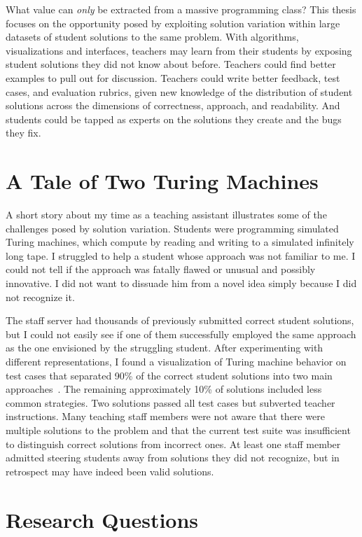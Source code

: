 \documentclass[12pt,twoside]{mitthesis}
\begin{document}
What value can {\it only} be extracted from a massive programming class? This thesis focuses on the opportunity posed by exploiting solution variation within large datasets of student solutions to the same problem. With algorithms, visualizations and interfaces, teachers may learn from their students by exposing student solutions they did not know about before. Teachers could find better examples to pull out for discussion. Teachers could write better feedback, test cases, and evaluation rubrics, given new knowledge of the distribution of student solutions across the dimensions of correctness, approach, and readability. And students could be tapped as experts on the solutions they create and the bugs they fix.

\section{A Tale of Two Turing Machines}

A short story about my time as a teaching assistant illustrates some of the challenges posed by solution variation. Students were programming simulated Turing machines, which compute by reading and writing to a simulated infinitely long tape. I struggled to help a student whose approach was not familiar to me. I could not tell if the approach was fatally flawed or unusual and possibly innovative. I did not want to dissuade him from a novel idea simply because I did not recognize it.

The staff server had thousands of previously submitted correct student solutions, but I could not easily see if one of them successfully employed the same approach as the one envisioned by the struggling student. After experimenting with different representations, I found a visualization of Turing machine behavior on test cases that separated 90\% of the correct student solutions into two main approaches~\cite{ICERGlassman}. The remaining approximately 10\% of solutions included less common strategies. Two solutions passed all test cases but subverted teacher instructions. Many teaching staff members were not aware that there were multiple solutions to the problem and that the current test suite was insufficient to distinguish correct solutions from incorrect ones. At least one staff member admitted steering students away from solutions they did not recognize, but in retrospect may have indeed been valid solutions.

\section{Research Questions}
\end{document}
